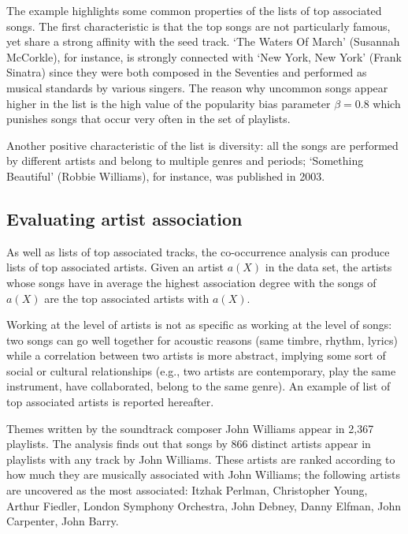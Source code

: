 The example highlights some common properties of the lists of top associated songs.
The first characteristic is that the top songs are not particularly famous, yet share a strong affinity with the seed track.
 `The Waters Of March' (Susannah McCorkle), for instance, is strongly connected with `New York, New York' (Frank Sinatra) since they were both composed in the Seventies and performed as musical standards by various singers.
The reason why uncommon songs appear higher in the list is the high value of the popularity bias parameter $\beta = 0.8$ which punishes songs that occur very often in the set of playlists.

Another positive characteristic of the list is diversity: all the songs are performed by different artists and belong to multiple genres and periods; `Something Beautiful' (Robbie Williams), for instance, was published in 2003.


\subsection{Evaluating artist association} %

As well as lists of top associated tracks, the co-occurrence analysis can produce lists of top associated artists.
Given an artist $a(X)$ in the data set, the artists whose songs have in average the highest association degree with the songs of $a(X)$ are the top associated artists with $a(X)$.

Working at the level of artists is not as specific as working at the level of songs: two songs can go well together for acoustic reasons (same timbre, rhythm, lyrics) while a correlation between two artists is more abstract, implying some sort of social or cultural relationships (e.g., two artists are contemporary, play the same instrument, have collaborated, belong to the same genre).
An example of list of top associated artists is reported hereafter.

\begin{example}
Themes written by the soundtrack composer John Williams appear in 2,367 playlists.
The analysis finds out that songs by 866 distinct artists appear in playlists with any track by John Williams. These artists are ranked according to how much they are musically associated with John Williams;
the following artists are uncovered as the most associated: Itzhak Perlman, Christopher Young, Arthur Fiedler, London Symphony Orchestra, John Debney, Danny Elfman, John Carpenter, John Barry.
\end{example}

